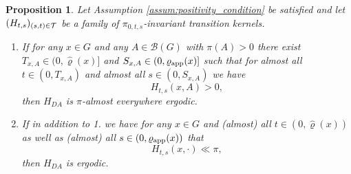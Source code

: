 \documentclass[sn-mathphys-num]{sn-jnl}%
\theoremstyle{thmstyleone}%
\newtheorem{proposition}[theorem]{Proposition}%
\theoremstyle{thmstyletwo}%
\theoremstyle{thmstylethree}%
\newcommand{\rhoapp}{\varrho_{{\rm app}}}
\newcommand{\change}[1]{\bgroup\color{black}#1\egroup}    %
\begin{document}
\begin{proposition}
    \label{prop:DAHSS:ergodic}
    Let Assumption \ref{assum:positivity_condition} be satisfied and let $(H_{t,s})_{\change{(s,t)\in \mathcal T}}$ be a family of $\pi_{0,t,s}$-invariant transition kernels.
    \begin{enumerate}
        \item \label{statement1}
        If for any $x\in G$ and any $A\in\mathcal{B}(G)$ with $\pi(A)>0$ there exist $T_{x,A}\in(0, \widehat{\varrho}(x)]$ and $S_{x,A}\in(0, \rhoapp(x)]$ such that for almost all $t\in(0,T_{x,A})$ and almost all $s\in(0,S_{x,A})$ we have 
        \[
           H_{t,s}(x,A)>0,
        \]
        then $H_{DA}$ is $\pi$-almost everywhere ergodic.
        \item \label{statement2}
        If in addition to 1. we have for any $x\in G$ and (almost) all $t\in(0,\widehat{\varrho}(x))$ as well as (almost) all $s\in(0, \rhoapp(x))$ that
        \[
        H_{t,s}(x,\cdot) \ll \pi,
        \]    
        then $H_{DA}$ is ergodic.
    \end{enumerate}
%
\end{proposition}
\end{document}
